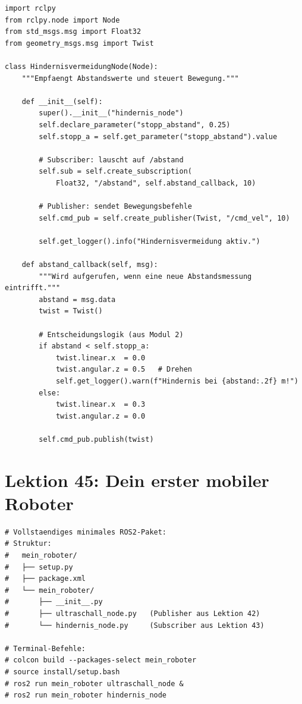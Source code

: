 \begin{lstlisting}
import rclpy
from rclpy.node import Node
from std_msgs.msg import Float32
from geometry_msgs.msg import Twist

class HindernisvermeidungNode(Node):
    """Empfaengt Abstandswerte und steuert Bewegung."""

    def __init__(self):
        super().__init__("hindernis_node")
        self.declare_parameter("stopp_abstand", 0.25)
        self.stopp_a = self.get_parameter("stopp_abstand").value

        # Subscriber: lauscht auf /abstand
        self.sub = self.create_subscription(
            Float32, "/abstand", self.abstand_callback, 10)

        # Publisher: sendet Bewegungsbefehle
        self.cmd_pub = self.create_publisher(Twist, "/cmd_vel", 10)

        self.get_logger().info("Hindernisvermeidung aktiv.")

    def abstand_callback(self, msg):
        """Wird aufgerufen, wenn eine neue Abstandsmessung eintrifft."""
        abstand = msg.data
        twist = Twist()

        # Entscheidungslogik (aus Modul 2)
        if abstand < self.stopp_a:
            twist.linear.x  = 0.0
            twist.angular.z = 0.5   # Drehen
            self.get_logger().warn(f"Hindernis bei {abstand:.2f} m!")
        else:
            twist.linear.x  = 0.3
            twist.angular.z = 0.0

        self.cmd_pub.publish(twist)
\end{lstlisting}

\section{Lektion 45: Dein erster mobiler Roboter}

\begin{lstlisting}
# Vollstaendiges minimales ROS2-Paket:
# Struktur:
#   mein_roboter/
#   ├── setup.py
#   ├── package.xml
#   └── mein_roboter/
#       ├── __init__.py
#       ├── ultraschall_node.py   (Publisher aus Lektion 42)
#       └── hindernis_node.py     (Subscriber aus Lektion 43)

# Terminal-Befehle:
# colcon build --packages-select mein_roboter
# source install/setup.bash
# ros2 run mein_roboter ultraschall_node &
# ros2 run mein_roboter hindernis_node
\end{lstlisting}

